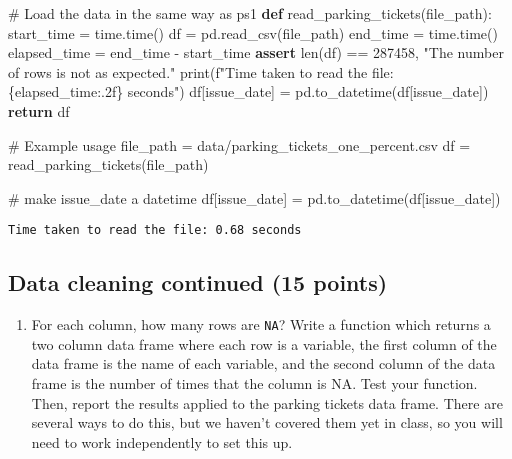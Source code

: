 \documentclass[
  letterpaper,
  DIV=11,
  numbers=noendperiod]{scrartcl}
\newenvironment{Shaded}{\begin{snugshade}}{\end{snugshade}}
\newcommand{\BuiltInTok}[1]{\textcolor[rgb]{0.00,0.23,0.31}{#1}}
\newcommand{\CommentTok}[1]{\textcolor[rgb]{0.37,0.37,0.37}{#1}}
\newcommand{\ControlFlowTok}[1]{\textcolor[rgb]{0.00,0.23,0.31}{\textbf{#1}}}
\newcommand{\DecValTok}[1]{\textcolor[rgb]{0.68,0.00,0.00}{#1}}
\newcommand{\KeywordTok}[1]{\textcolor[rgb]{0.00,0.23,0.31}{\textbf{#1}}}
\newcommand{\NormalTok}[1]{\textcolor[rgb]{0.00,0.23,0.31}{#1}}
\newcommand{\OperatorTok}[1]{\textcolor[rgb]{0.37,0.37,0.37}{#1}}
\newcommand{\SpecialCharTok}[1]{\textcolor[rgb]{0.37,0.37,0.37}{#1}}
\newcommand{\SpecialStringTok}[1]{\textcolor[rgb]{0.13,0.47,0.30}{#1}}
\newcommand{\StringTok}[1]{\textcolor[rgb]{0.13,0.47,0.30}{#1}}
\providecommand{\tightlist}{%
  \setlength{\itemsep}{0pt}\setlength{\parskip}{0pt}}\usepackage{longtable,booktabs,array}
\begin{document}
\begin{Shaded}
\begin{Highlighting}[]
\CommentTok{\# Load the data in the same way as ps1}
\KeywordTok{def}\NormalTok{ read\_parking\_tickets(file\_path):}
\NormalTok{    start\_time }\OperatorTok{=}\NormalTok{ time.time()}
\NormalTok{    df }\OperatorTok{=}\NormalTok{ pd.read\_csv(file\_path)}
\NormalTok{    end\_time }\OperatorTok{=}\NormalTok{ time.time()}
\NormalTok{    elapsed\_time }\OperatorTok{=}\NormalTok{ end\_time }\OperatorTok{{-}}\NormalTok{ start\_time}
    \ControlFlowTok{assert} \BuiltInTok{len}\NormalTok{(df) }\OperatorTok{==} \DecValTok{287458}\NormalTok{, }\StringTok{"The number of rows is not as expected."}
    \BuiltInTok{print}\NormalTok{(}\SpecialStringTok{f"Time taken to read the file: }\SpecialCharTok{\{}\NormalTok{elapsed\_time}\SpecialCharTok{:.2f\}}\SpecialStringTok{ seconds"}\NormalTok{)}
\NormalTok{    df[}\StringTok{\textquotesingle{}issue\_date\textquotesingle{}}\NormalTok{] }\OperatorTok{=}\NormalTok{ pd.to\_datetime(df[}\StringTok{\textquotesingle{}issue\_date\textquotesingle{}}\NormalTok{])}
    \ControlFlowTok{return}\NormalTok{ df}

\CommentTok{\# Example usage}
\NormalTok{file\_path }\OperatorTok{=} \StringTok{\textquotesingle{}data/parking\_tickets\_one\_percent.csv\textquotesingle{}}
\NormalTok{df }\OperatorTok{=}\NormalTok{ read\_parking\_tickets(file\_path)}

\CommentTok{\# make issue\_date a datetime}
\NormalTok{df[}\StringTok{\textquotesingle{}issue\_date\textquotesingle{}}\NormalTok{] }\OperatorTok{=}\NormalTok{ pd.to\_datetime(df[}\StringTok{\textquotesingle{}issue\_date\textquotesingle{}}\NormalTok{])}
\end{Highlighting}
\end{Shaded}

\begin{verbatim}
Time taken to read the file: 0.68 seconds
\end{verbatim}

\subsection{Data cleaning continued (15
points)}\label{data-cleaning-continued-15-points}

\begin{enumerate}
\def\labelenumi{\arabic{enumi}.}
\tightlist
\item
  For each column, how many rows are \texttt{NA}? Write a function which
  returns a two column data frame where each row is a variable, the
  first column of the data frame is the name of each variable, and the
  second column of the data frame is the number of times that the column
  is NA. Test your function. Then, report the results applied to the
  parking tickets data frame. There are several ways to do this, but we
  haven't covered them yet in class, so you will need to work
  independently to set this up.
\end{enumerate}
\end{document}
